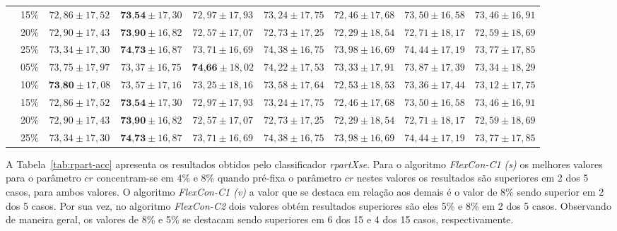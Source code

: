 \begin{table}[h]
{\begin{tabular}{|c|c|c|c|c|c|c|c|c|}
                 & 15\% & $72,86 \pm 17,52$ & $\textbf{73,54} \pm 17,30$ & $72,97 \pm 17,93$ & $73,24 \pm 17,75$ & $72,46 \pm 17,68$ & $73,50 \pm 16,58$ & $73,46 \pm 16,91$ \\ \cline{2-9}
                 & 20\% & $72,90 \pm 17,43$ & $\textbf{73,90} \pm 16,82$ & $72,57 \pm 17,07$ & $72,73 \pm 17,25$ & $72,29 \pm 18,54$ & $72,71 \pm 18,17$ & $72,59 \pm 18,69$ \\ \cline{2-9}
                 & 25\% & $73,34 \pm 17,30$ & $\textbf{74,73} \pm 16,87$ & $73,71 \pm 16,69$ & $74,38 \pm 16,75$ & $73,98 \pm 16,69$ & $74,44 \pm 17,19$ & $73,77 \pm 17,85$ \\ \hline
                \parbox[t]{3mm}{} & 05\% & $73,75 \pm 17,97$ & $73,37 \pm 16,75$ & $\textbf{74,66} \pm 18,02$ & $74,22 \pm 17,53$ & $73,33 \pm 17,91$ & $73,87 \pm 17,39$ & $73,34 \pm 18,29$ \\ 
                & 10\% & $\textbf{73,80} \pm 17,08$ & $73,57 \pm 17,16$ & $73,25 \pm 18,16$ & $73,58 \pm 17,64$ & $72,53 \pm 18,53$ & $73,36 \pm 17,44$ & $73,12 \pm 17,75$ \\ 
                & 15\% & $72,86 \pm 17,52$ & $\textbf{73,54} \pm 17,30$ & $72,97 \pm 17,93$ & $73,24 \pm 17,75$ & $72,46 \pm 17,68$ & $73,50 \pm 16,58$ & $73,46 \pm 16,91$ \\ 
                & 20\% & $72,90 \pm 17,43$ & $\textbf{73,90} \pm 16,82$ & $72,57 \pm 17,07$ & $72,73 \pm 17,25$ & $72,29 \pm 18,54$ & $72,71 \pm 18,17$ & $72,59 \pm 18,69$ \\ 
                & 25\% & $73,34 \pm 17,30$ & $\textbf{74,73} \pm 16,87$ & $73,71 \pm 16,69$ & $74,38 \pm 16,75$ & $73,98 \pm 16,69$ & $74,44 \pm 17,19$ & $73,77 \pm 17,85$ \\ \hline
            \end{tabular}%
        }
        \label{tab:naive-acc}
    \end{table}
    
    A Tabela~\ref{tab:rpart-acc} apresenta os resultados obtidos pelo classificador \textit{rpartXse}. Para o algoritmo \textit{FlexCon\hyp{C1} (s)} os melhores valores para o parâmetro $cr$ concentram\hyp{se} em 4\% e 8\% quando pré\hyp{fixa} o parâmetro $cr$ nestes valores os resultados são superiores em 2 dos 5 casos, para ambos valores. O algoritmo \textit{FlexCon\hyp{C1} (v)} a valor que se destaca em relação aos demais é o valor de 8\% sendo superior em 2 dos 5 casos. Por sua vez, no algoritmo \textit{FlexCon\hyp{C2}} dois valores obtém resultados superiores são eles 5\% e 8\% em 2 dos 5 casos. Observando de maneira geral, os valores de 8\% e 5\% se destacam sendo superiores em 6 dos 15 e 4 dos 15 casos, respectivamente.
    
